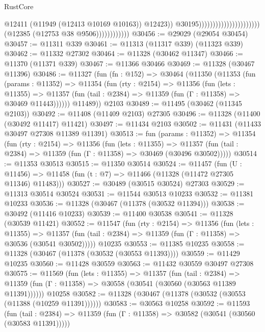\begin{lexlean}{RustCore}
\begin{coremodule}
                                                                        @12411
                                                                        (@11949
                                                                          (@12413 @10169 @10163))
                                                                        @12423))
                                                                    @30195))))))))))))))))))))))
                        (@12385 (@12753 @38 @9506))))))))))))
@30456 := @29029 (@29054 @30454)
@30457 := @11311 @339
@30461 := @11313 (@11317 @339) (@11323 @339)
@30462 := @11332 @27302
@30464 := @11328 (@30462 @11347)
@30466 := @11370 (@11371 @339)
@30467 := @11366 @30466
@30469 := @11328 (@30467 @11396)
@30486 := @11327
    (fun (fn : @152) =>
    @30464
      (@11350
        (@11353
          (fun (params : @11352) =>
          @11354
            (fun (rty : @2154) =>
            @11356
              (fun (lets : @11355) =>
              @11357 (fun (tail : @2384) => @11359 (fun (Γ : @11358) => @30469 @11443))))))
        @11489))
    @2103
@30489 := @11495 (@30462 (@11345 @2103))
@30492 := @11408 (@11409 @2103) @27305
@30496 := @11328 (@11400 (@30492 @11417) @11421)
@30497 := @11434 @2103
@30502 := @11431 (@11433 @30497 @27308 @11389 @11391)
@30513 := fun (params : @11352) =>
  @11354
    (fun (rty : @2154) =>
    @11356
      (fun (lets : @11355) =>
      @11357 (fun (tail : @2384) => @11359 (fun (Γ : @11358) => @30469 (@30496 @30502)))))
@30514 := @11353 @30513
@30515 := @11350 @30514
@30524 := @11457
    (fun (U : @11456) => @11458 (fun (t : @7) => @11466 (@11328 (@11472 @27305 @11346) @11483)))
@30527 := @30489 (@30515 @30524) @27303
@30529 := @11313 @30514 @30524
@30531 := @11544 @30513 @10233
@30532 := @11381 @10233
@30536 := @11328 (@30467 (@11378 (@30532 @11394)))
@30538 := @30492 (@11416 @10233)
@30539 := @11400 @30538
@30541 := @11328 (@30539 @11421)
@30552 := @11547
    (fun (rty : @2154) =>
    @11356
      (fun (lets : @11355) =>
      @11357 (fun (tail : @2384) => @11359 (fun (Γ : @11358) => @30536 (@30541 @30502)))))
    @10235
@30553 := @11385 @10235
@30558 := @11328 (@30467 (@11378 (@30532 (@30553 @11393))))
@30559 := @11429 @10235
@30560 := @11428 @30559
@30563 := @11432 @30559 @30497 @27308
@30575 := @11569
    (fun (lets : @11355) =>
    @11357
      (fun (tail : @2384) =>
      @11359 (fun (Γ : @11358) => @30558 (@30541 (@30560 (@30563 @11389 @11391))))))
    @10258
@30582 := @11328 (@30467 (@11378 (@30532 (@30553 (@11388 (@10259 @11391))))))
@30583 := @30563 @10258
@30592 := @11593
    (fun (tail : @2384) => @11359 (fun (Γ : @11358) => @30582 (@30541 (@30560 (@30583 @11391)))))

\end{coremodule}
\end{lexlean}
